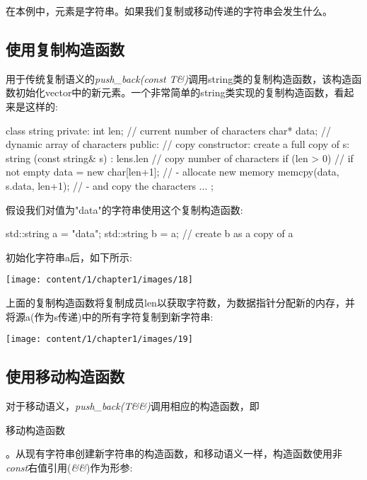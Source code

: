 在本例中，元素是字符串。如果我们复制或移动传递的字符串会发生什么。

\subsection{使用复制构造函数}

用于传统复制语义的\textit{push_back(const T\&)}调用string类的复制构造函数，该构造函数初始化vector中的新元素。一个非常简单的string类实现的复制构造函数，看起来是这样的:

\begin{cppcode}
class string {
	private:
	int len; // current number of characters
	char* data; // dynamic array of characters
	public:
	// copy constructor: create a full copy of s:
	string (const string& s)
	: len{s.len} { // copy number of characters
		if (len > 0) { // if not empty
			data = new char[len+1]; // - allocate new memory
			memcpy(data, s.data, len+1); // - and copy the characters
		}
	}
	...
};
\end{cppcode}

假设我们对值为"data"的字符串使用这个复制构造函数:

\begin{cppcode}
std::string a = "data";
std::string b = a; // create b as a copy of a
\end{cppcode}

初始化字符串a后，如下所示:

\begin{center}
	\texttt{[image: content/1/chapter1/images/18]}
\end{center}

上面的复制构造函数将复制成员len以获取字符数，为数据指针分配新的内存，并将源a(作为s传递)中的所有字符复制到新字符串:

\begin{center}
	\texttt{[image: content/1/chapter1/images/19]}
\end{center}

\subsection{使用移动构造函数}

对于移动语义，\textit{push_back(T\&\&)}调用相应的构造函数，即\begin{cppcode}
移动构造函数
\end{cppcode}。从现有字符串创建新字符串的构造函数，和移动语义一样，构造函数使用非\textit{const}右值引用(\textit{\&\&})作为形参:

